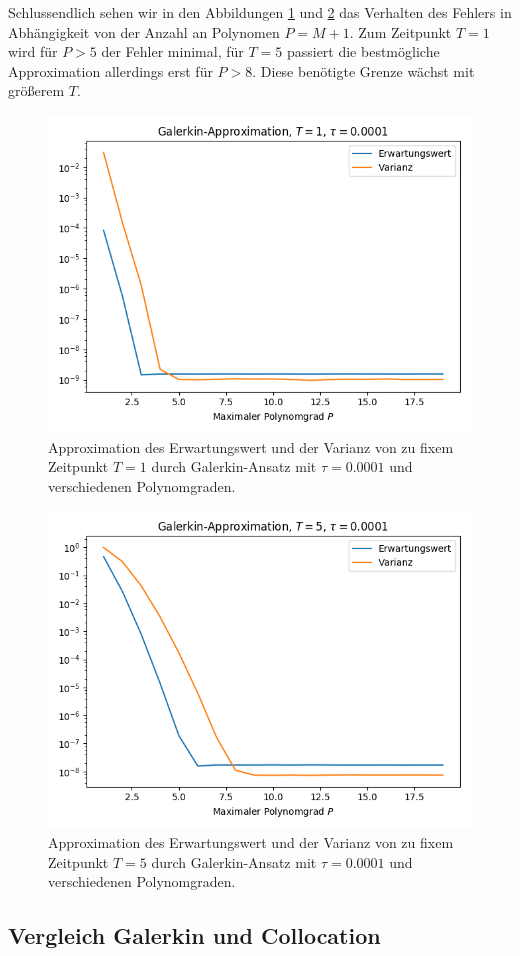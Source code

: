 Schlussendlich sehen wir in den Abbildungen \ref{fig:galerkin_bydegree_trial1_t1} und \ref{fig:galerkin_bydegree_trial1_t5} das Verhalten des Fehlers in Abhängigkeit von der Anzahl an Polynomen $P=M+1$. Zum Zeitpunkt $T=1$ wird für $P>5$ der Fehler minimal, für $T=5$ passiert die bestmögliche Approximation allerdings erst für $P>8$. Diese benötigte Grenze wächst mit größerem $T$. 
\begin{figure}[!htb]
\centering
\includegraphics[width=0.5\linewidth]{Figures/galerkin_bydegree_trial1_t1.png}
\caption{Approximation des Erwartungswert und der Varianz von  zu fixem Zeitpunkt $T=1$ durch Galerkin-Ansatz mit $\tau=0.0001$ und verschiedenen Polynomgraden.}
\label{fig:galerkin_bydegree_trial1_t1}
\end{figure}

\begin{figure}[!htb]
\centering
\includegraphics[width=0.5\linewidth]{Figures/galerkin_bydegree_trial1_t5.png}
\caption{Approximation des Erwartungswert und der Varianz von  zu fixem Zeitpunkt $T=5$ durch Galerkin-Ansatz mit $\tau=0.0001$ und verschiedenen Polynomgraden.}
\label{fig:galerkin_bydegree_trial1_t5}
\end{figure}
\subsection{Vergleich Galerkin und Collocation}

